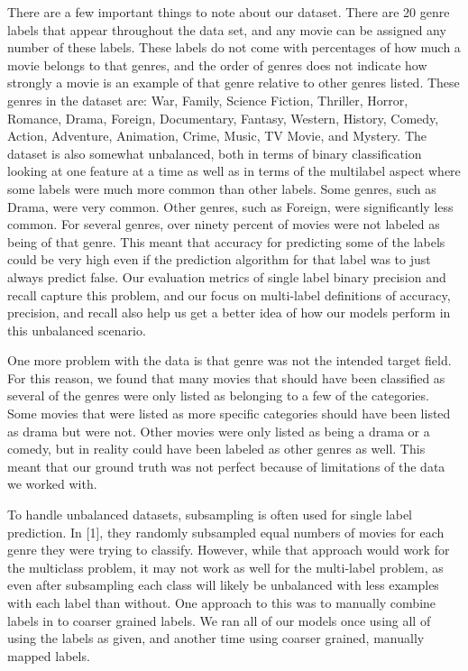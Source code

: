 \documentclass[sigconf]{acmart}
\begin{document}
There are a few important things to note about our dataset.  There are 20 genre labels that appear throughout the data set, and any movie can be assigned any number of these labels.  These labels do not come with percentages of how much a movie belongs to that genres, and the order of genres does not indicate how strongly a movie is an example of that genre relative to other genres listed.  These genres in the dataset are: War, Family, Science Fiction, Thriller, Horror, Romance, Drama, Foreign, Documentary, Fantasy, Western, History, Comedy, Action, Adventure, Animation, Crime, Music, TV Movie, and Mystery. The dataset is also somewhat unbalanced, both in terms of binary classification looking at one feature at a time as well as in terms of the multilabel aspect where some labels were much more common than other labels.  Some genres, such as Drama, were very common.  Other genres, such as Foreign, were significantly less common. For several genres, over ninety percent of movies were not labeled as being of that genre. This meant that accuracy for predicting some of the labels could be very high even if the prediction algorithm for that label was to just always predict false.  Our evaluation metrics of single label binary precision and recall capture this problem, and our focus on multi-label definitions of accuracy, precision, and recall also help us get a better idea of how our models perform in this unbalanced scenario. 

One more problem with the data is that genre was not the intended target field.  For this reason, we found that many movies that should have been classified as several of the genres were only listed as belonging to a few of the categories.  Some movies that were listed as more specific categories should have been listed as drama but were not. Other movies were only listed as being a drama or a comedy, but in reality could have been labeled as other genres as well.  This meant that our ground truth was not perfect because of limitations of the data we worked with. 

To handle unbalanced datasets, subsampling is often used for single label prediction.  In [1], they randomly subsampled equal numbers of movies for each genre they were trying to classify.  However, while that approach would work for the multiclass problem, it may not work as well for the multi-label problem, as even after subsampling each class will likely be unbalanced with less examples with each label than without. One approach to this was to manually combine labels in to coarser grained labels.  We ran all of our models once using all of using the labels as given, and another time using coarser grained, manually mapped labels. 
\end{document}
